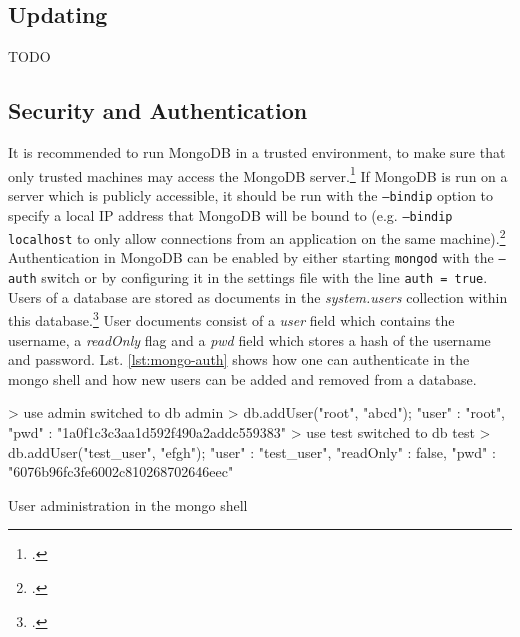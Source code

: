 \subsection{Updating}
\label{sec:maintenance-updating}
TODO

\subsection{Security and Authentication}
\label{sec:maintenance-security}
It is recommended to run MongoDB in a trusted environment, to make sure that
only trusted machines may access the MongoDB
server.\footcite[Cf.][118]{Chodorow_2010}
If MongoDB is run on a server which is publicly accessible, it should be
run with the \texttt{--bindip} option to specify a local IP address that MongoDB
will be bound to (e.g. \texttt{--bindip localhost} to only allow
connections from an application on the same
machine).\footcite[Cf.][118]{Chodorow_2010}
Authentication in MongoDB can be enabled by either starting \texttt{mongod} with the \texttt{--auth} switch or by configuring it in the settings file with the line \texttt{auth = true}.
Users of a database are stored as documents in the \textit{system.users} collection
within this database.\footcite[Cf.][TODO]{mongo_authentication}
User documents consist of a \textit{user} field which contains the username,
a \textit{readOnly} flag and a \textit{pwd} field which stores a hash of the
username and password. Lst. \ref{lst:mongo-auth} shows how one can
authenticate in the mongo shell and how new users can be added and removed from
a database.

\begin{listing}
    \begin{javascriptcode}
> use admin
switched to db admin
> db.addUser("root", "abcd");
{
"user" : "root",
"pwd" : "1a0f1c3c3aa1d592f490a2addc559383"
}
> use test
switched to db test
> db.addUser("test_user", "efgh");
{
"user" : "test_user",
"readOnly" : false,
"pwd" : "6076b96fc3fe6002c810268702646eec"
}
    \end{javascriptcode}
    \caption{User administration in the mongo shell}
    \label{lst:mongo-auth}
\end{listing}



